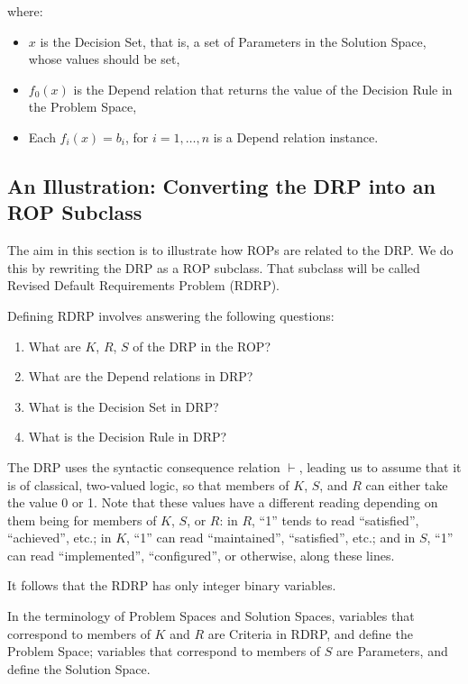 \documentclass[graybox]{svmult}
\newcommand{\RPfull}{Requirements Problem}
\newcommand{\ZJRP}{DRP}
\newcommand{\SolutionSpace}{Solution Space}
\newcommand{\ProblemSpace}{Problem Space}
\newcommand{\Criteria}{Criteria}
\newcommand{\Parameter}{Parameter}
\newcommand{\Depend}{Depend}
\newcommand{\DecisionRule}{Decision Rule}
\newcommand{\ROP}{ROP}
\newcommand{\DecisionSet}{Decision Set}
\newcommand{\ZJROPfull}{Revised Default \RPfull}
\newcommand{\ZJROP}{RDRP}
\begin{document}
where:
\begin{itemize}
    \item{$x$ is the \DecisionSet, that is, a set of \Parameter s in the \SolutionSpace, whose values should be set,}
    \item{$f_{0}(x)$ is the \Depend{} relation that returns the value of the \DecisionRule{} in the \ProblemSpace,}
    \item{Each $f_{i}(x) = b_{i}$, for $i = 1, \dots, n$ is a \Depend{} relation instance.}
\end{itemize}


%
\subsection{An Illustration: Converting the \ZJRP{} into an \ROP{} Subclass}\label{s:rop:zjrop}
The aim in this section is to illustrate how \ROP s are related to the \ZJRP. We do this by rewriting the \ZJRP{} as a \ROP{} subclass. That subclass will be called \ZJROPfull{} (\ZJROP).

Defining \ZJROP{} involves answering the following questions:
\begin{enumerate}
    \item{What are $K$, $R$, $S$ of the \ZJRP{} in the \ROP?}
    \item{What are the \Depend{} relations in \ZJRP?}
    \item{What is the \DecisionSet{} in \ZJRP?}
    \item{What is the \DecisionRule{} in \ZJRP?}
\end{enumerate}

The \ZJRP{} uses the syntactic consequence relation $\vdash$, leading us to assume that it is of classical, two-valued logic, so that members of $K$, $S$, and $R$ can either take the value 0 or 1. Note that these values have a different reading depending on them being for members of $K$, $S$, or $R$: in $R$, ``1'' tends to read ``satisfied'', ``achieved'', etc.; in $K$, ``1'' can read ``maintained'', ``satisfied'', etc.; and in $S$, ``1'' can read ``implemented'', ``configured'', or otherwise, along these lines. 

It follows that the \ZJROP{} has only integer binary variables. 

In the terminology of \ProblemSpace s and \SolutionSpace s, variables that correspond to members of $K$ and $R$ are \Criteria{} in \ZJROP, and define the \ProblemSpace; variables that correspond to members of $S$ are \Parameter s, and define the \SolutionSpace.
\end{document}
